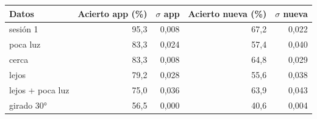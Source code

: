\begin{tabular}{lrrrr}
\toprule
Datos & Acierto app (\%) & $\sigma$ app & Acierto nueva (\%) & $\sigma$ nueva \\
\midrule
sesión 1 & 95,3 & 0,008 & 67,2 & 0,022 \\
poca luz & 83,3 & 0,024 & 57,4 & 0,040 \\
cerca & 83,3 & 0,008 & 64,8 & 0,029 \\
lejos & 79,2 & 0,028 & 55,6 & 0,038 \\
lejos + poca luz & 75,0 & 0,036 & 63,9 & 0,043 \\
girado 30° & 56,5 & 0,000 & 40,6 & 0,004 \\
\bottomrule
\end{tabular}
